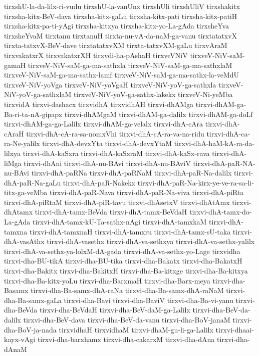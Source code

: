{tirxshU-la-da-lilx-ri-vudu
tirxshU-la-vanUnx
tirxshUli
tirxshUliV
tirxshakitx
tirxsha-kitx-BeV-dava
tirxsha-kitx-gaLu
tirxsha-kitx-pati
tirxsha-kitx-patiH
tirxsha-kitx-pa-ti-yAgi
tirxsha-kitxya
tirxsha-kitx-yo-La-gAda
tirxsheYva
tirxsheYvaM
tirxtanu
tirxtanuH
tirxta-nu-vA-da-naM-ga-vanu
tirxtatatxvX
tirxta-tatxvX-BeV-dave
tirxtatatxvXM
tirxta-tatxvXM-gaLu
tirxvAraM
tirxvakatxrX
tirxvakatxrXH
tirxvdi-ha-pAshaH
tirxveVNiV
tirxveV-NiV-saM-gamaH
tirxveV-NiV-saM-ga-ma-sathxla
tirxveV-NiV-saM-ga-ma-sathxlaM
tirxveV-NiV-saM-ga-ma-sathx-lamf
tirxveV-NiV-saM-ga-ma-sathx-la-veMdU
tirxveV-NiV-yoVga
tirxveV-NiV-yoVgaH
tirxveV-NiV-yoV-ga-sathxla
tirxveV-NiV-yoV-ga-sathxlaM
tirxveV-NiV-yoV-ga-sathx-lakekx
tirxveV-Ni-yeMba
tirxvidA
tirxvi-dashacx
tirxvidhA
tirxvidhAH
tirxvi-dhAMga
tirxvi-dhAM-ga-Ba-ri-ta-nA-gipapx
tirxvi-dhAMgaM
tirxvi-dhAM-ga-dalilx
tirxvi-dhAM-ga-doLf
tirxvi-dhAM-ga-ga-Lalilx
tirxvi-dhAM-ga-velalx
tirxvi-dhA-cAra
tirxvi-dhA-cAraH
tirxvi-dhA-cA-ra-sa-nomxVhi
tirxvi-dhA-cA-ra-va-na-ridu
tirxvi-dhA-ca-ra-Ne-yalilx
tirxvi-dhA-devxYta
tirxvi-dhA-devxYtaM
tirxvi-dhA-haM-kA-ra-da-lilxya
tirxvi-dhA-kaSxra
tirxvi-dhA-kaSxraM
tirxvi-dhA-kaSx-rava
tirxvi-dhA-liMga
tirxvi-dhAni
tirxvi-dhA-nu-BAvi
tirxvi-dhA-nu-BAviV
tirxvi-dhA-paR-NA-nu-BAvi
tirxvi-dhA-paRNa
tirxvi-dhA-paRNaM
tirxvi-dhA-paR-Na-dalilx
tirxvi-dhA-paR-Na-gaLu
tirxvi-dhA-paR-Nakekx
tirxvi-dhA-paR-Na-kirx-ye-ve-ra-sa-li-titx-ga-veMba
tirxvi-dhA-paR-Nava
tirxvi-dhA-paR-Na-viva
tirxvi-dhA-piRta
tirxvi-dhA-piRtaM
tirxvi-dhA-piR-tavu
tirxvi-dhAsetxV
tirxvi-dhAtAmx
tirxvi-dhAtamx
tirxvi-dhA-tamx-BeVda
tirxvi-dhA-tamx-BeVdaH
tirxvi-dhA-tamx-do-La-gAda
tirxvi-dhA-tamx-kU-Ta-sathx-nAgi
tirxvi-dhA-tamxkaM
tirxvi-dhA-tamxna
tirxvi-dhA-tamxnaH
tirxvi-dhA-tamxru
tirxvi-dhA-tamx-sU-taka
tirxvi-dhA-vasAthx
tirxvi-dhA-vasethx
tirxvi-dhA-va-sethxya
tirxvi-dhA-va-sethx-yalilx
tirxvi-dhA-va-sethx-ya-lolxM-dA-gada
tirxvi-dhA-va-sethx-yo-Lage
tirxvidha
tirxvi-dha-BU-tikA
tirxvi-dha-BU-tika
tirxvi-dha-Bakatx
tirxvi-dha-BakatxH
tirxvi-dha-Bakitx
tirxvi-dha-BakitxH
tirxvi-dha-Ba-kitxge
tirxvi-dha-Ba-kitxya
tirxvi-dha-Ba-kitx-yoLu
tirxvi-dha-BarxmaH
tirxvi-dha-Barx-meya
tirxvi-dha-Basamx
tirxvi-dha-Ba-samx-dhA-raNa
tirxvi-dha-Ba-samx-dhA-raNaM
tirxvi-dha-Ba-samx-gaLa
tirxvi-dha-Bavi
tirxvi-dha-BaviV
tirxvi-dha-Ba-vi-yanu
tirxvi-dha-BeVda
tirxvi-dha-BeVdaH
tirxvi-dha-BeV-daM-ga-Lalilx
tirxvi-dha-BeV-da-dalilx
tirxvi-dha-BeV-dava
tirxvi-dha-BeV-da-vanu
tirxvi-dha-BoV-janaM
tirxvi-dha-BoV-ja-nada
tirxvidhaH
tirxvidhaM
tirxvi-dhaM-gu-li-ga-Lalilx
tirxvi-dhaai-kayx-vAgi
tirxvi-dha-barxhamx
tirxvi-dha-cakarxM
tirxvi-dha-dAna
tirxvi-dha-dAnaM
}
